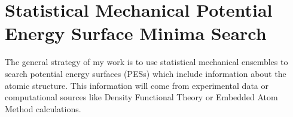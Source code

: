 \chapter{Statistical Mechanical Potential Energy Surface Minima Search}
The general strategy of my work is to use statistical mechanical ensembles to search potential energy surfaces (PESs) which include information about the atomic structure. This information will come from experimental data or computational sources like Density Functional Theory or Embedded Atom Method calculations.
